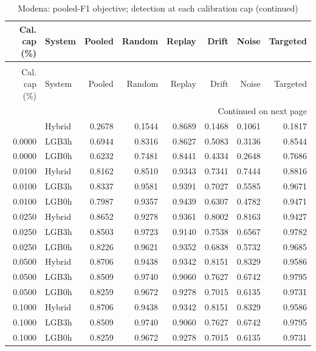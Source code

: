 \begingroup
\small
\setlength{\tabcolsep}{4pt}
\renewcommand{\arraystretch}{1.1}
\begin{longtable}{@{}rlrrrrrr@{}}
\caption{Modena: pooled-F1 objective; detection at each calibration cap}\label{tab:selected_modena_pooled_detection-supp20261008}\\
\toprule
\shortstack{Cal. cap\\(\%)} & System & Pooled & Random & Replay & Drift & Noise & Targeted \\
\midrule
\endfirsthead
\caption[]{Modena: pooled-F1 objective; detection at each calibration cap (continued)}\\
\toprule
\shortstack{Cal. cap\\(\%)} & System & Pooled & Random & Replay & Drift & Noise & Targeted \\
\midrule
\endhead
\midrule
\multicolumn{8}{r}{Continued on next page}\\
\endfoot
\bottomrule
\endlastfoot
0.0000 & Hybrid & 0.2678 & 0.1544 & 0.8689 & 0.1468 & 0.1061 & 0.1817 \\*
0.0000 & LGB3h & 0.6944 & 0.8316 & 0.8627 & 0.5083 & 0.3136 & 0.8544 \\*
0.0000 & LGB0h & 0.6232 & 0.7481 & 0.8441 & 0.4334 & 0.2648 & 0.7686 \\
0.0100 & Hybrid & 0.8162 & 0.8510 & 0.9343 & 0.7341 & 0.7444 & 0.8816 \\*
0.0100 & LGB3h & 0.8337 & 0.9581 & 0.9391 & 0.7027 & 0.5585 & 0.9671 \\*
0.0100 & LGB0h & 0.7987 & 0.9357 & 0.9439 & 0.6307 & 0.4782 & 0.9471 \\
0.0250 & Hybrid & 0.8652 & 0.9278 & 0.9361 & 0.8002 & 0.8163 & 0.9427 \\*
0.0250 & LGB3h & 0.8503 & 0.9723 & 0.9140 & 0.7538 & 0.6567 & 0.9782 \\*
0.0250 & LGB0h & 0.8226 & 0.9621 & 0.9352 & 0.6838 & 0.5732 & 0.9685 \\
0.0500 & Hybrid & 0.8706 & 0.9438 & 0.9342 & 0.8151 & 0.8329 & 0.9586 \\*
0.0500 & LGB3h & 0.8509 & 0.9740 & 0.9060 & 0.7627 & 0.6742 & 0.9795 \\*
0.0500 & LGB0h & 0.8259 & 0.9672 & 0.9278 & 0.7015 & 0.6135 & 0.9731 \\
0.1000 & Hybrid & 0.8706 & 0.9438 & 0.9342 & 0.8151 & 0.8329 & 0.9586 \\*
0.1000 & LGB3h & 0.8509 & 0.9740 & 0.9060 & 0.7627 & 0.6742 & 0.9795 \\*
0.1000 & LGB0h & 0.8259 & 0.9672 & 0.9278 & 0.7015 & 0.6135 & 0.9731 \\

\end{longtable}
